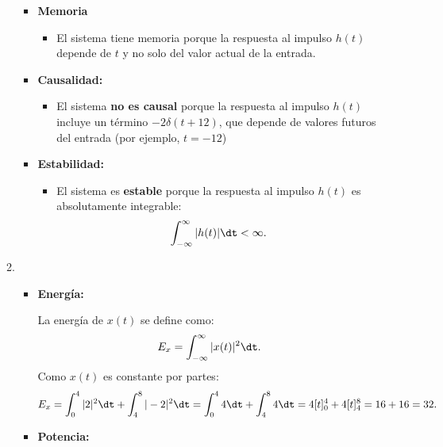 \begin{enumerate}[label=\color{red}\textbf{\arabic*)}]
\begin{enumerate}[label=\color{red}\textbf{\alph*)}]
        \begin{itemize}[label=\textbullet]
            \item \textbf{Memoria}
                \begin{itemize}[label=\textbullet]
                    \item El sistema tiene memoria porque la respuesta al impulso $h(t)$ depende de $t$ y no solo del valor actual de la entrada.
                \end{itemize}
            \item \textbf{Causalidad:}
                \begin{itemize}[label=\textbullet]
                    \item El sistema \textbf{no es causal} porque la respuesta al impulso $h(t)$ incluye un término $-2\delta(t+12)$, que depende de valores futuros del entrada (por ejemplo, $t=-12$)
                \end{itemize}
            \item \textbf{Estabilidad:}
                \begin{itemize}[label=\textbullet]
                    \item El sistema es \textbf{estable} porque la respuesta al impulso $h(t)$ es absolutamente integrable: \[
                    \int_{-\infty}^{\infty} |h(t)|\dt<\infty. 
                    \] 
                \end{itemize}
        \end{itemize}
    \item {}

        \begin{itemize}[label=\textbullet]
            \item \textbf{Energía:}

                La energía de $x(t)$ se define como:  \[
                E_x=\int_{-\infty}^{\infty} |x(t)|^2\dt. 
                \] 
                Como $x(t)$ es constante por partes: \[
                    E_x=\int_{0}^{4} |2|^2\dt+\int_{4}^{8} |-2|^2\dt=\int_{0}^{4} 4\dt+\int_{4}^{8} 4\dt=4[t]_{0}^4+4[t]_4^8 =16+16=32.
                \] 
            \item \textbf{Potencia:}


\end{itemize}
\end{enumerate}
\end{enumerate}
